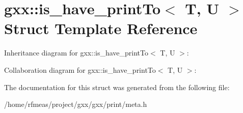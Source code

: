 \hypertarget{structgxx_1_1is__have__printTo}{}\section{gxx\+:\+:is\+\_\+have\+\_\+print\+To$<$ T, U $>$ Struct Template Reference}
\label{structgxx_1_1is__have__printTo}


Inheritance diagram for gxx\+:\+:is\+\_\+have\+\_\+print\+To$<$ T, U $>$\+:


Collaboration diagram for gxx\+:\+:is\+\_\+have\+\_\+print\+To$<$ T, U $>$\+:


The documentation for this struct was generated from the following file\+:\begin{DoxyCompactItemize}
\item 
/home/rfmeas/project/gxx/gxx/print/meta.\+h\end{DoxyCompactItemize}

